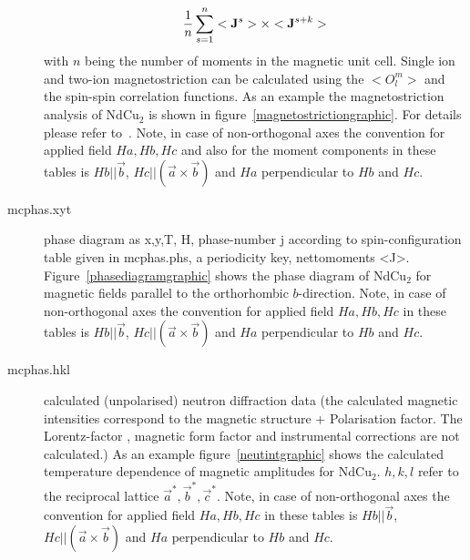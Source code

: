 \begin{description}
	       \begin{equation}
	        \frac{1}{n}\sum_{s=1}^n <{\mathbf J}^s> \times  <{\mathbf J}^{s+k}>
	       \end{equation}
	       with $n$ being the number of moments in the magnetic unit cell.
	       Single ion and two-ion magnetostriction can be calculated using the $<O_l^m>$ and the
	       spin-spin correlation functions. As an example the magnetostriction analysis of
	       NdCu$_2$ is shown in figure~\ref{magnetostrictiongraphic}. For details 
             please refer to~\cite{rotter02-8885}.
                            Note, in case of non-orthogonal axes the convention for applied field $Ha, Hb,Hc$ and
                            also for the moment components in these tables 
                            is $Hb||\vec b$, $Hc||(\vec a \times \vec b)$ and $Ha$ perpendicular to $Hb$ and $Hc$.
\item [\prg mcphas.xyt]    phase diagram as x,y,T, H, phase-number j according to spin-configuration table
               given in mcphas.phs, a periodicity key, nettomoments <J>.
 Figure~\ref{phasediagramgraphic}
	       shows the phase diagram of NdCu$_2$ for magnetic fields parallel to the orthorhombic $b$-direction.
                            Note, in case of non-orthogonal axes the convention for applied field $Ha, Hb,Hc$ 
                             in these tables 
                            is $Hb||\vec b$, $Hc||(\vec a \times \vec b)$ and $Ha$ perpendicular to $Hb$ and $Hc$.
\item [\prg mcphas.hkl]    calculated (unpolarised) neutron diffraction data (the calculated magnetic intensities
    correspond to the magnetic structure + Polarisation factor. The
    Lorentz-factor , magnetic form factor and  instrumental corrections are not calculated.)
 As an example figure~\ref{neutintgraphic}
    shows the calculated temperature dependence of magnetic amplitudes for NdCu$_2$.
                           $h,k,l$ refer to the reciprocal lattice $\vec a^*,\vec b^*,\vec c^*$.
                            Note, in case of non-orthogonal axes the convention for applied field $Ha, Hb,Hc$ 
                             in these tables 
                            is $Hb||\vec b$, $Hc||(\vec a \times \vec b)$ and $Ha$ perpendicular to $Hb$ and $Hc$.
    

\end{description}
